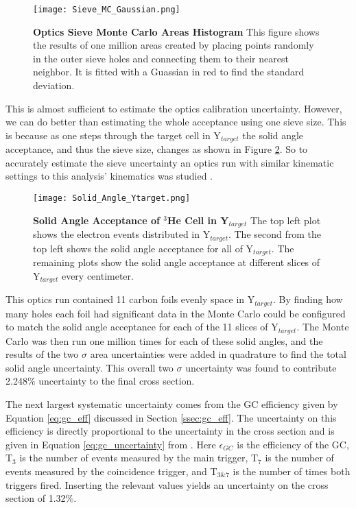 \begin{figure}[!ht]
\begin{center}
\texttt{[image: Sieve\_MC\_Gaussian.png]}
\end{center}
\caption[Optics Sieve Monte Carlo Areas Histogram]{
{\bf{Optics Sieve Monte Carlo Areas Histogram}} This figure shows the results of one million areas created by placing points randomly in the outer sieve holes and connecting them to their nearest neighbor. It is fitted with a Guassian in red to find the standard deviation.}
\label{fig:sieve_mc_gaussian}
\end{figure}

This is almost sufficient to estimate the optics calibration uncertainty. However, we can do better than estimating the whole acceptance using one sieve size. This is because as one steps through the target cell in Y$_{target}$ the solid angle acceptance, and thus the sieve size, changes as shown in Figure \ref{fig:solid_angle_ytarget}. So to accurately estimate the sieve uncertainty an optics run with similar kinematic settings to this analysis' kinematics was studied \cite{shujie_optics}. 

\begin{figure}[!ht]
\begin{center}
\texttt{[image: Solid\_Angle\_Ytarget.png]}
\end{center}
\caption[Solid Angle Acceptance of $^3$He Cell in Y$_{target}$]{
{\bf{Solid Angle Acceptance of $^3$He Cell in Y$_{target}$}} The top left plot shows the electron events distributed in Y$_{target}$. The second from the top left shows the solid angle acceptance for all of Y$_{target}$. The remaining plots show the solid angle acceptance at different slices of Y$_{target}$ every centimeter.}
\label{fig:solid_angle_ytarget}
\end{figure}

This optics run contained 11 carbon foils evenly space in Y$_{target}$. By finding how many holes each foil had significant data in the Monte Carlo could be configured to match the solid angle acceptance for each of the 11 slices of Y$_{target}$. The Monte Carlo was then run one million times for each of these solid angles, and the results of the two $\sigma$ area uncertainties were added in quadrature to find the total solid angle uncertainty. This overall two $\sigma$ uncertainty was found to contribute 2.248$\%$ uncertainty to the final cross section.

The next largest systematic uncertainty comes from the GC efficiency given by Equation \ref{eq:gc_eff} discussed in Section \ref{ssec:gc_eff}. The uncertainty on this efficiency is directly proportional to the uncertainty in the cross section and is given in Equation \ref{eq:gc_uncertainty} from \cite{dien_gc}. Here $\epsilon_{GC}$ is the efficiency of the GC, T$_3$ is the number of events measured by the main trigger, T$_7$ is the number of events measured by the coincidence trigger, and T$_{3\&7}$ is the number of times both triggers fired. Inserting the relevant values yields an uncertainty on the cross section of 1.32$\%$.

